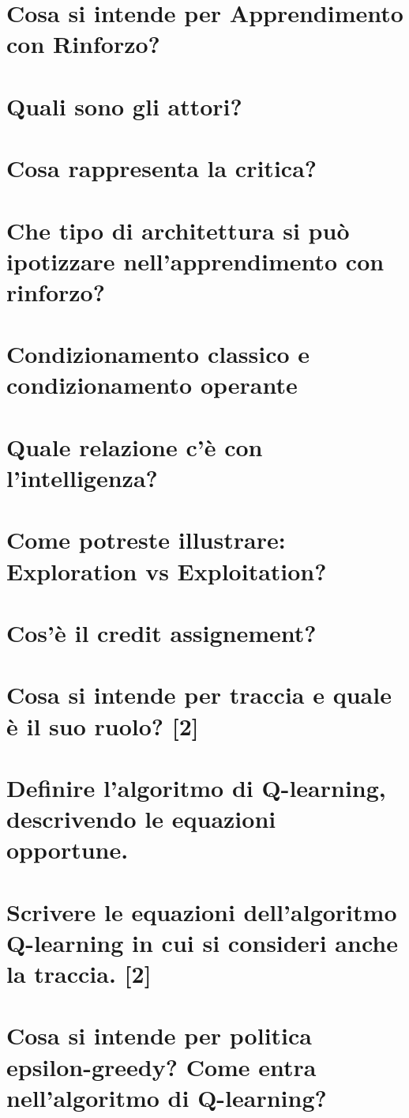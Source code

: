 \documentclass[\main/main.tex]{subfiles}
\begin{document}
\section{Cosa si intende per Apprendimento con Rinforzo?}
\section{Quali sono gli attori?}
\section{Cosa rappresenta la critica?}
\section{Che tipo di architettura si può ipotizzare nell'apprendimento con rinforzo?}
\section{Condizionamento classico e condizionamento operante}
\section{Quale relazione c'è con l'intelligenza?}
\section{Come potreste illustrare: Exploration vs Exploitation?}
\section{Cos'è il credit assignement?}
\section{Cosa si intende per traccia e quale è il suo ruolo? [2]}
\section{Definire l’algoritmo di Q-learning, descrivendo le equazioni opportune.}
\section{Scrivere le equazioni dell'algoritmo Q-learning in cui si consideri anche la traccia. [2]}
\section{Cosa si intende per politica epsilon-greedy? Come entra nell’algoritmo di Q-learning? }
\end{document}
